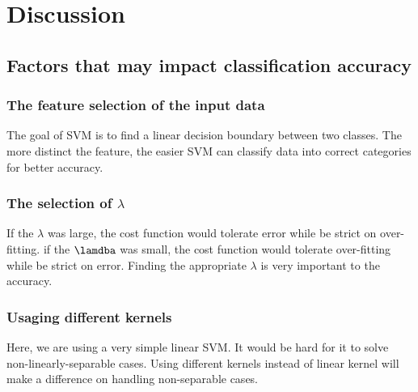 \documentclass{article}
\begin{document}
\begin{table}[htbp] 
\end{table}


\section{Discussion}
\subsection{Factors that may impact classification accuracy}
\subsubsection{The feature selection of the input data}
The goal of SVM is to find a linear decision boundary between two classes. The more distinct the feature, the easier SVM can classify data into correct categories for better accuracy.
\subsubsection{The selection of $\lambda$}
If the $\lambda$ was large, the cost function would tolerate error while be strict on over-fitting. if the $ \lamdba $ was small, the cost function would tolerate over-fitting while be strict on error. Finding the appropriate $\lambda$ is very important to the accuracy.
\subsubsection{Usaging different kernels}
Here, we are using a very simple linear SVM. It would be hard for it to solve non-linearly-separable cases. Using different kernels instead of linear kernel will make a difference on handling non-separable cases.
\end{document}
